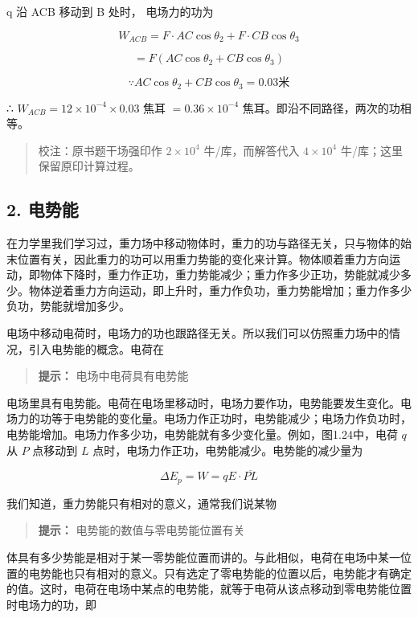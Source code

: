 q 沿 ACB 移动到 B 处时， 电场力的功为

\[
W_{ACB}=F\cdot AC\cos\theta_2+F\cdot CB\cos\theta_3
\]

\[
= F (A C \cos \theta_{2} + C B \cos \theta_{3})
\]

\[
\because AC\cos\theta_2+CB\cos\theta_3=0.03\text{米}
\]

∴ \(W_{ACB}=12\times10^{-4}\times0.03\) 焦耳 \(=0.36\times10^{-4}\)
焦耳。即沿不同路径，两次的功相等。

\begin{quote}
校注：原书题干场强印作 \(2\times10^4\) 牛/库，而解答代入 \(4\times10^4\)
牛/库；这里保留原印计算过程。
\end{quote}

\subsection{2. 电势能}\label{ux7535ux52bfux80fd}

在力学里我们学习过，重力场中移动物体时，重力的功与路径无关，只与物体的始末位置有关，因此重力的功可以用重力势能的变化来计算。物体顺着重力方向运动，即物体下降时，重力作正功，重力势能减少；重力作多少正功，势能就减少多少。物体逆着重力方向运动，即上升时，重力作负功，重力势能增加；重力作多少负功，势能就增加多少。

电场中移动电荷时，电场力的功也跟路径无关。所以我们可以仿照重力场中的情况，引入电势能的概念。电荷在

\begin{quote}
\textbf{提示：} 电场中电荷具有电势能
\end{quote}

电场里具有电势能。电荷在电场里移动时，电场力要作功，电势能要发生变化。电场力的功等于电势能的变化量。电场力作正功时，电势能减少；电场力作负功时，电势能增加。电场力作多少功，电势能就有多少变化量。例如，图1.24中，电荷
\(q\) 从 \(P\) 点移动到 \(L\)
点时，电场力作正功，电势能减少。电势能的减少量为

\[
\Delta E_{p} = W = q E \cdot \overline {{P L}}
\]

我们知道，重力势能只有相对的意义，通常我们说某物

\begin{quote}
\textbf{提示：} 电势能的数值与零电势能位置有关
\end{quote}

体具有多少势能是相对于某一零势能位置而讲的。与此相似，电荷在电场中某一位置的电势能也只有相对的意义。只有选定了零电势能的位置以后，电势能才有确定的值。这时，电荷在电场中某点的电势能，就等于电荷从该点移动到零电势能位置时电场力的功，即

